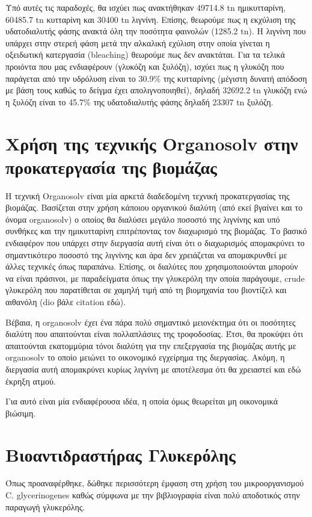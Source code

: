 \documentclass[11pt]{article}
\begin{document}
Υπό αυτές τις παραδοχές, θα ισχύει πως ανακτήθηκαν 49714.8 tn ημικυτταρίνη, 60485.7 tn κυτταρίνη και 30400 tn λιγνίνη. Επίσης, θεωρούμε πως η εκχύλιση της υδατοδιαλυτής φάσης ανακτά όλη την ποσότητα φαινολών (1285.2 tn). Η λιγνίνη που υπάρχει στην στερεή φάση μετά την αλκαλική εχύλιση στην οποία γίνεται η οξειδωτική κατεργασία (bleaching) θεωρούμε πως δεν ανακτάται. Για τα τελικά προιόντα που μας ενδιαφέρουν (γλυκόζη και ξυλόζη), ισχύει πως η γλυκόζη που παράγεται από την υδρόλυση είναι το 30.9\% της κυτταρίνης (μέγιστη δυνατή απόδοση με βάση τους \cite{fernandez-bolanosCharacterizationLigninObtained1999} καθώς το δείγμα έχει απολιγνοποιηθεί), δηλαδή 32692.2 tn γλυκόζη ενώ η ξυλόζη είναι το 45.7\% της υδατοδιαλυτής φάσης δηλαδή 23307 tn ξυλόζη.

\section{Χρήση της τεχνικής Organosolv στην προκατεργασία της βιομάζας}
\label{sec:org042b76f}
Η τεχνική Organosolv είναι μία αρκετά διαδεδομένη τεχνική προκατεργασίας της βιομάζας. Βασίζεται στην χρήση κάποιου οργανικού διαλύτη (από εκεί βγαίνει και το όνομα organosolv) ο οποίος θα διαλύσει μεγάλο ποσοστό της λιγνίνης και υπό συνθήκες και την ημικυτταρίνη επιτρέποντας τον διαχωρισμό της βιομάζας. Το βασικό ενδιαφέρον που υπάρχει στην διεργασία αυτή είναι ότι ο διαχωρισμός απομακρύνει το σημαντικότερο ποσοστό της λιγνίνης και άρα δεν χρειάζεται να απομακρυνθεί με άλλες τεχνικές όπως παραπάνω. Επίσης, οι διαλύτες που χρησιμοποιούνται μπορούν να είναι πράσινοι, με παραδείγματα όπως την γλυκερόλη την οποία παράγουμε, crude γλυκερόλη που παρατίθεται σε χαμηλή τιμή από τη βιομηχανία του βιοντίζελ \cite{sunGlycerolOrganosolvPretreatment2022} και αιθανόλη (dio βάλε citation εδώ).

Βέβαια, η organosolv έχει ένα πάρα πολύ σημαντικό μειονέκτημα ότι οι ποσότητες διαλύτη που απαιτούνται είναι πολλαπλάσιες της τροφοδοσίας. Έτσι, θα προκύψει ότι απαιτούνται εκατομμύρια τόνοι διαλύτη για την επεξεργασία της βιομάζας αυτής με organosolv το οποίο μειώνει το οικονομικό εγχείρημα της διεργασίας. Ακόμη, η διεργασία αυτή απομακρύνει κυρίως λιγνίνη με αποτέλεσμα ότι θα χρειαστεί και εδώ έκρηξη ατμού.

Για αυτό είναι μία ενδιαφέρουσα ιδέα, η οποία όμως θεωρείται μη οικονομικά βιώσιμη.

\section{Βιοαντιδραστήρας Γλυκερόλης}
\label{sec:org4143e3a}
Όπως προαναφέρθηκε, δώθηκε περισσότερη έμφαση στη χρήση του μικροοργανισμού C. glycerinogenes καθώς σύμφωνα με την βιβλιογραφία \cite{zhugeGlycerolProductionNovel2001} είναι πολύ αποδοτικός στην παραγωγή γλυκερόλης.
\end{document}
